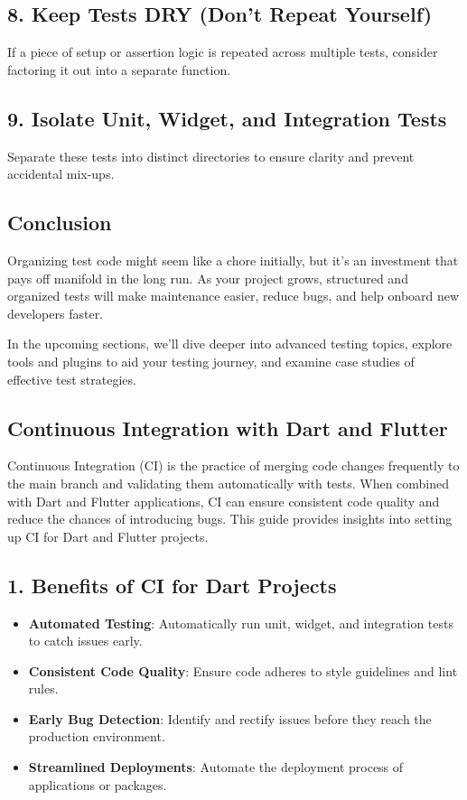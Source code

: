 \subsection*{8. Keep Tests DRY (Don't Repeat Yourself)}

If a piece of setup or assertion logic is repeated across multiple tests, consider factoring it out into a separate function.

\subsection*{9. Isolate Unit, Widget, and Integration Tests}

Separate these tests into distinct directories to ensure clarity and prevent accidental mix-ups.

\subsection*{Conclusion}

Organizing test code might seem like a chore initially, but it's an investment that pays off manifold in the long run. As your project grows, structured and organized tests will make maintenance easier, reduce bugs, and help onboard new developers faster.

In the upcoming sections, we'll dive deeper into advanced testing topics, explore tools and plugins to aid your testing journey, and examine case studies of effective test strategies.


\subsection{Continuous Integration with Dart and Flutter}

Continuous Integration (CI) is the practice of merging code changes frequently to the main branch and validating them automatically with tests. When combined with Dart and Flutter applications, CI can ensure consistent code quality and reduce the chances of introducing bugs. This guide provides insights into setting up CI for Dart and Flutter projects.

\subsection*{1. Benefits of CI for Dart Projects}

\begin{itemize}
 \item \textbf{Automated Testing}: Automatically run unit, widget, and integration tests to catch issues early.
 \item \textbf{Consistent Code Quality}: Ensure code adheres to style guidelines and lint rules.
 \item \textbf{Early Bug Detection}: Identify and rectify issues before they reach the production environment.
 \item \textbf{Streamlined Deployments}: Automate the deployment process of applications or packages.
\end{itemize}

